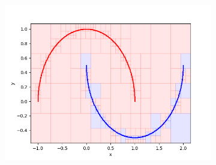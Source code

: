 \begin{figure}
\begin{subfigure}{0.31\textwidth}
\includegraphics[width=\linewidth]{visual500}
\end{subfigure}


\end{figure}
